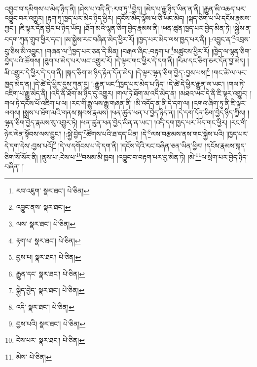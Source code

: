 འབྱུང་བ་དམིགས་པ་མེད་ཉིད་ནི། །ཤེས་པ་འདི་ནི་:རབ་ཏུ་\footnote{རབ་འཇུག་  སྣར་ཐང་།  པེ་ཅིན། }བྱེད། །མེད་པ་རྒྱུ་ཉིད་ཡིན་ན་ནི། །རྒྱུན་མི་འཆད་པར་འབྱུང་བར་འགྱུར། །རྟག་ཏུ་ཁྱད་པར་མེད་ཉིད་ཕྱིར། །དངོས་མེད་ལྟོས་པ་ཅི་ཡང་མེད། །སྐད་ཅིག་པ་ཡི་དངོས་རྣམས་ཀྱང་། །ཇི་ལྟར་དོན་བྱེད་པ་ཉིད་ཡོད། །ཐོག་མའི་ལྷན་ཅིག་བྱེད་རྣམས་ནི། །ཕན་ཚུན་ཁྱད་པར་བྱེད་མིན་ཏེ། །སྐྱེས་ན་བདག་ཀུན་གྲུབ་ཕྱིར་དང་། །མ་སྐྱེས་རང་བཞིན་མེད་ཕྱིར་རོ། །ཁྱད་པར་མེད་ལས་ཁྱད་པར་ནི། །:འབྱུང་ན་\footnote{འབྱུང་ནས་  སྣར་ཐང་། }འབྲས་བུ་ཅིས་མི་འབྱུང་། །གཞན་ལ་\footnote{ལས་  སྣར་ཐང་།  པེ་ཅིན། }ཁྱད་པར་ཅན་དེ་མིན། །བརྒལ་ཞིང་:བརྟག་པ་\footnote{རྟག་པ་  སྣར་ཐང་།  པེ་ཅིན། }མཚུངས་ཕྱིར་རོ། །ཁྱེད་ལ་ལྷན་ཅིག་བྱེད་པའི་ཚོགས། །ཐུག་པ་མེད་པར་ཡང་འགྱུར་རོ། །དེ་ལྟར་གང་ཕྱིར་དེ་དག་ནི། །རིམ་དང་ཅིག་ཅར་དོན་བྱ་མེད། །མི་འགྱུར་དེ་ཕྱིར་དེ་དག་ནི། །སྐད་ཅིག་མ་ཉིད་རྟེན་དོན་མེད། །དེ་ལྟར་ལྷན་ཅིག་བྱེད་:བྱས་པས།\footnote{བྱས་པ།  སྣར་ཐང་།  པེ་ཅིན། } །གང་ཚེ་ལ་ལར་ཁྱད་མེད་ན། །དེ་ཚེ་དེ་ཕྱིར་དུས་ཀུན་དུ། །:རྒྱུན་ཡང་\footnote{རྒྱུན་དང་  སྣར་ཐང་།  པེ་ཅིན། }ཁྱད་པར་མེད་པ་ཉིད། །དེ་ཚེ་དེ་ཕྱིར་རྒྱུན་ལ་ཡང་། །གལ་ཏེ་འཇིག་པ་རྒྱུ་མེད་ནི། །འདི་ནི་ཐོག་མ་ཉིད་དུ་འགྱུར། །གལ་ཏེ་ཐོག་མ་འདི་མེད་ན། །མཐའ་ཡང་དེ་ནི་ཇི་ལྟར་འགྱུར། །གལ་ཏེ་དངོས་པོ་འཇིག་པ་ལ། །རང་གི་རྒྱུ་ལས་རྒྱུ་གཞན་ནི། །མི་འདོད་ན་ནི་དེ་དག་ལ། །འགའ་ཞིག་ཏུ་ནི་ཇི་ལྟར་ལགས། །སྨྲས་པ་ཐོག་མའི་གནས་སྐབས་རྣམས། །ཕན་ཚུན་ཕན་པ་བྱེད་ཉིད་ན། །དེ་དག་དོན་ཅིག་བྱེད་ཉིད་ཀྱིས། །ལྷན་ཅིག་བྱེད་རྣམས་སུ་འགྱུར་ཏེ། །ཕན་ཚུན་ཕན་བྱེད་མིན་ན་ཡང་། །འདི་དག་ཁྱད་པར་ཡོད་གང་ཕྱིར། །རང་གི་ཉེར་ལེན་སྟོབས་ལས་བྱུང་། །:སྐྱེ་བྱེད་\footnote{སྐྱེད་བྱེད་  སྣར་ཐང་།  པེ་ཅིན། }ཚོགས་པའི་ཐ་དད་ཡིན། །དེ་\footnote{འདི་  སྣར་ཐང་།  པེ་ཅིན། }ལས་བརྩམས་ནས་གང་སྐྱེས་པའི། །ཁྱད་པར་དེ་དག་དེས་:བྱས་པའོ།\footnote{བྱས་པའི།  སྣར་ཐང་།  པེ་ཅིན། } །དེ་ལ་དགོངས་པ་དེ་དག་ནི། །དངོས་དེའི་རང་བཞིན་ཅན་ཡིན་ཕྱིར། །དངོས་རྣམས་སྐད་ཅིག་སོ་སོར་ནི། །ནུས་པ་:ངེས་པ་\footnote{ངེས་པར་  སྣར་ཐང་།  པེ་ཅིན། }བསམ་མི་ཁྱབ། །འབྱུང་བ་བརྟག་པར་བྱ་མིན་ཏེ། །མེ་\footnote{མེས་  པེ་ཅིན། }ལ་སྲེག་པར་བྱེད་ཉིད་བཞིན། །
